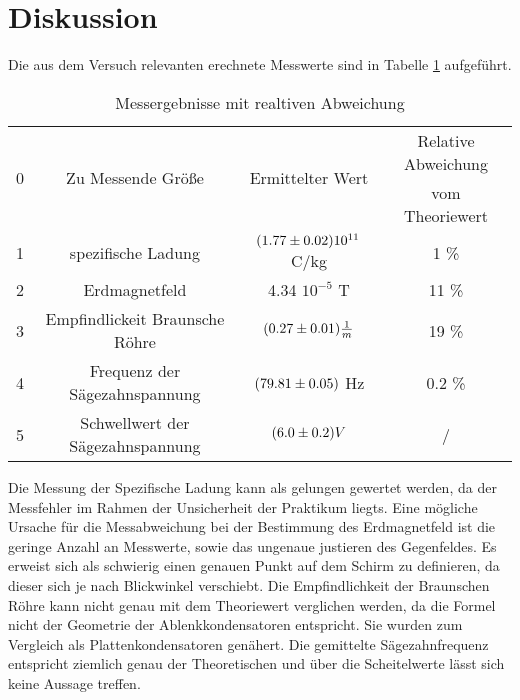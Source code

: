 \section{Diskussion}
\label{sec:Diskussion}
Die aus dem Versuch relevanten erechnete Messwerte sind in Tabelle \ref{tab:sum} aufgeführt.
\begin{table}
  \centering
  \begin{tabular}{c| c c c}
    \toprule
	\multirow{2}{*}{0} & \multirow{2}{*}{Zu Messende Größe} & \multirow{2}{*}{Ermittelter Wert} & Relative Abweichung \\
	& & & vom Theoriewert \\
    \midrule
    1& spezifische Ladung & $(\num{1.77 +- 0.02})10^{11}$ C/kg & 1 \%	\\
    2& Erdmagnetfeld 	  &  4.34 \cdot $10^{-5}$ T       & 11 \% 	\\
    3& Empfindlickeit Braunsche Röhre& $(\num{0.27 +- 0.01}) \frac{1}{m}$ & 19 \% \\
    4& Frequenz der Sägezahnspannung& $(\num{79.81 +- 0.05})$ Hz & 0.2 \% \\
    5& Schwellwert der Sägezahnspannung& $ (\num{6.0 +- 0.2}) V $& / \\
    \bottomrule
  \end{tabular}
  \caption{Messergebnisse mit realtiven Abweichung}
  \label{tab:sum}
\end{table}
Die Messung der Spezifische Ladung kann als gelungen gewertet werden, da der Messfehler im Rahmen der Unsicherheit der Praktikum liegts. Eine mögliche Ursache für die Messabweichung bei der Bestimmung des Erdmagnetfeld ist die geringe Anzahl an Messwerte, sowie das ungenaue justieren des Gegenfeldes. Es erweist sich als schwierig einen genauen Punkt auf dem Schirm zu definieren, da dieser sich je nach Blickwinkel verschiebt. Die Empfindlichkeit der Braunschen Röhre kann nicht genau mit dem Theoriewert verglichen werden, da die Formel nicht der Geometrie der Ablenkkondensatoren entspricht. Sie wurden zum Vergleich als Plattenkondensatoren genähert. Die gemittelte Sägezahnfrequenz entspricht ziemlich genau der Theoretischen und über die Scheitelwerte lässt sich keine Aussage treffen. 
